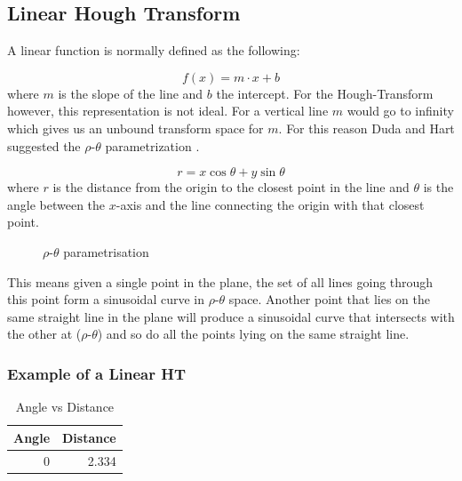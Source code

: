 \documentclass[10pt,twoside]{scrreprt}
\begin{document}
\subsection{Linear Hough Transform} %
\label{sub:linear_hough_transform}

A linear function is normally defined as the following:

\[
  f(x) = m\cdot x + b
\]
where $m$ is the slope of the line and $b$ the intercept. For the Hough-Transform however, this representation is not ideal. For a vertical line $m$ would go to infinity which gives us an unbound transform space for $m$. For this reason Duda and Hart suggested the $\rho\text{-}\theta$ parametrization \parencite{Duda:1972}.

\[
  r = x\cos\theta + y\sin\theta
\]
where $r$ is the distance from the origin to the closest point in the line and $\theta$ is the angle between the $x$-axis and the line connecting the origin with that closest point.

\begin{figure}[h]
  \centering
  \caption{$\rho\text{-}\theta$ parametrisation}
  \label{fig:rhotheta}
\end{figure}

This means given a single point in the plane, the set of all lines going through this point form a sinusoidal curve in $\rho\text{-}\theta$ space. Another point 
that lies on the same straight line in the plane will produce a sinusoidal curve that intersects with the other at ($\rho\text{-}\theta$) and so do all the points lying on the same straight line. 

\subsubsection{Example of a Linear HT} %
\label{ssub:example_of_a_linear_ht}

\begin{table}
\centering
\caption{Angle vs Distance}
\begin{tabular}{rr}
\toprule
 Angle & Distance \\
\midrule
0 & 2.334 \\
\bottomrule
\end{tabular}
\end{table}
\end{document}
